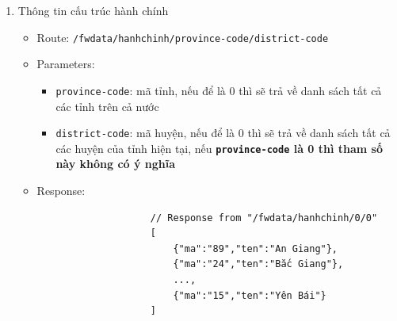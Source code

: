 \documentclass{article}
\begin{document}
\begin{enumerate}
	\item Thông tin cấu trúc hành chính
	      \begin{itemize}
		      \item Route: \texttt{/fwdata/hanhchinh/{province-code}/{district-code}}
		      \item Parameters:
		            \begin{itemize}
			            \item \texttt{province-code}: mã tỉnh, nếu để là 0 thì sẽ trả về danh sách tất cả các tỉnh trên cả nước
			            \item \texttt{district-code}: mã huyện, nếu để là 0 thì sẽ trả về danh sách tất cả các huyện của tỉnh hiện tại, nếu \textbf{ \texttt{province-code} là 0 thì tham số này không có ý nghĩa}
		            \end{itemize}
		      \item Response:
		            \begin{verbatim}
					// Response from "/fwdata/hanhchinh/0/0"
					[
						{"ma":"89","ten":"An Giang"},
						{"ma":"24","ten":"Bắc Giang"},
						...,
						{"ma":"15","ten":"Yên Bái"}
					]
					\end{verbatim}
	      \end{itemize}


\end{enumerate}
\end{document}
